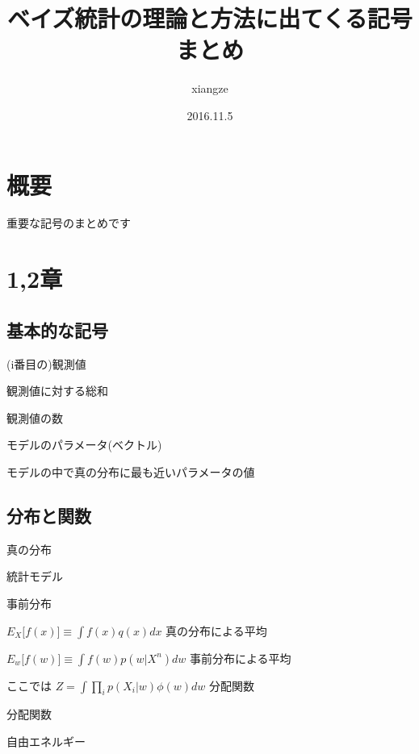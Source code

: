 \documentclass[10pt]{article}
\title{ベイズ統計の理論と方法に出てくる記号まとめ}
\author{xiangze}
\date{2016.11.5}
\begin{document}
\maketitle

\section*{概要}
重要な記号のまとめです
\section*{1,2章}
\subsection*{基本的な記号}
\begin{description}

\item[ $X_i$ ] (i番目の)観測値
\item[$\Sigma_{i=1}^N$ ] 観測値に対する総和
\item[$N$ ]観測値の数
\item[$w$]モデルのパラメータ(ベクトル)
\item[$w_0$ ]モデルの中で真の分布に最も近いパラメータの値

\subsection*{分布と関数}
\item[$q(x)$] 真の分布
\item[$p(X|w)$] 統計モデル
\item[$\phi(w)$] 事前分布
\item{$E_X \bigl[ f(x) \bigr] \equiv \int f(x)q(x)dx$} 真の分布による平均
\item{$E_w \bigl[ f(w) \bigr] \equiv \int f(w)p(w|X^n)dw $} 事前分布による平均
\item[$p(w|X^n) \propto p(X^n|w)\phi(w)$]
\item[$p(w|X^n) = \frac{p(X^n|w)\phi(w)}{Z}$]
ここでは $ Z= \int \prod_{i} p(X_i|w) \phi(w) dw$ 分配関数

\item[$ p(w|X^n) = \frac{\prod_n p(X^n|w)\phi(w)}{Z_n(\beta)}$]
\item[$ Z_n(\beta)= \int \prod_{i} p(X_i|w)^\beta \phi(w) dw$] 分配関数
\item[$F_n(\beta)=-\frac{1}{\beta}\log Z_n(\beta)$] 自由エネルギー


\end{description}
\end{document}

